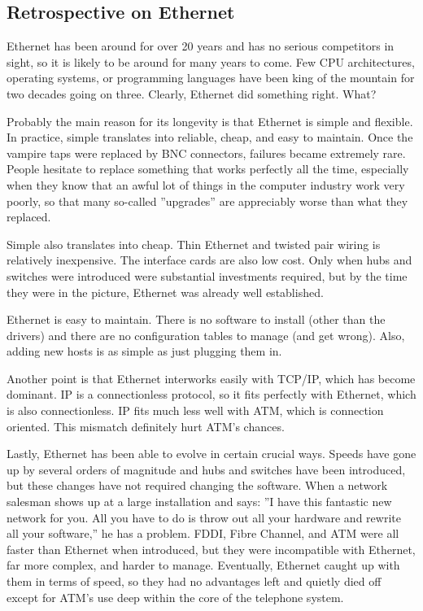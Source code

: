 \documentclass[b5paper,11pt]{memoir}
\begin{document}
\subsection{Retrospective on Ethernet}

Ethernet has been around for over 20 years and has no serious
competitors in sight, so it is likely to be around for many years to
come. Few CPU architectures, operating systems, or programming languages
have been king of the mountain for two decades going on three. Clearly,
Ethernet did something right. What?

Probably the main reason for its longevity is that Ethernet is simple
and flexible. In practice, simple translates into reliable, cheap, and
easy to maintain. Once the vampire taps were replaced by BNC connectors,
failures became extremely rare. People hesitate to replace something
that works perfectly all the time, especially when they know that an
awful lot of things in the computer industry work very poorly, so that
many so-called ''upgrades'' are appreciably worse than what they
replaced.

Simple also translates into cheap. Thin Ethernet and twisted pair wiring
is relatively inexpensive. The interface cards are also low cost. Only
when hubs and switches were introduced were substantial investments
required, but by the time they were in the picture, Ethernet was already
well established.

Ethernet is easy to maintain. There is no software to install (other
than the drivers) and there are no configuration tables to manage (and
get wrong). Also, adding new hosts is as simple as just plugging them
in.

Another point is that Ethernet interworks easily with TCP/IP, which has
become dominant. IP is a connectionless protocol, so it fits perfectly
with Ethernet, which is also connectionless. IP fits much less well with
ATM, which is connection oriented. This mismatch definitely hurt ATM's
chances.

Lastly, Ethernet has been able to evolve in certain crucial ways. Speeds
have gone up by several orders of magnitude and hubs and switches have
been introduced, but these changes have not required changing the
software. When a network salesman shows up at a large installation and
says: ''I have this fantastic new network for you. All you have to do is
throw out all your hardware and rewrite all your software,'' he has a
problem. FDDI, Fibre Channel, and ATM were all faster than Ethernet when
introduced, but they were incompatible with Ethernet, far more complex,
and harder to manage. Eventually, Ethernet caught up with them in terms
of speed, so they had no advantages left and quietly died off except for
ATM's use deep within the core of the telephone system.
\end{document}
